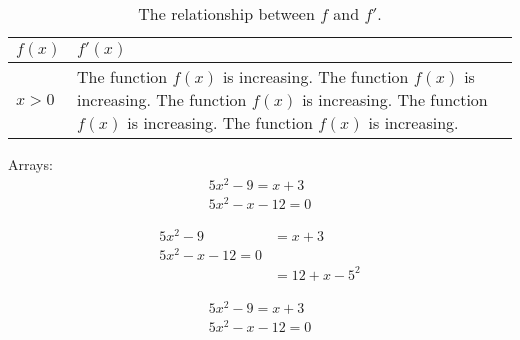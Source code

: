 \documentclass[11pt]{article}
\begin{document}
\begin{table}[H]
\centering
\caption{The relationship between $f$ and $f'$.}
\def\arraystretch{1.5}
\begin{tabular}{|l|p{3in}|}
\hline
$f(x)$ & $f'(x)$ \\ \hline
$x>0$ & The function $f(x)$ is increasing. The function $f(x)$ is increasing. The function $f(x)$ is increasing. The function $f(x)$ is increasing. The function $f(x)$ is increasing. \\ \hline

\end{tabular}
\end{table}


Arrays:
\begin{align}
5x^2-9=x+3\\
5x^2-x-12=0
\end{align}

\begin{align*}
5x^2-9&=x+3\\
5x^2-x-12=0\\
&=12+x-5^2
\end{align*}

\begin{align}
5x^2-9=x+3\\
5x^2-x-12=0
\end{align}
\end{document}
